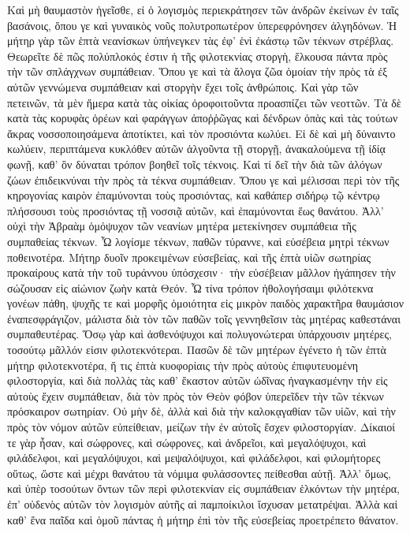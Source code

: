 Καὶ μὴ θαυμαστὸν ἡγεῖσθε, εἰ ὁ λογισμὸς περιεκράτησεν τῶν ἀνδρῶν ἐκείνων ἐν ταῖς βασάνοις, ὅπου γε καὶ γυναικὸς νοῦς πολυτροπωτέρον ὑπερεφρόνησεν ἀλγηδόνων. 
Ἡ μήτηρ γὰρ τῶν ἑπτὰ νεανίσκων ὑπήνεγκεν τὰς ἐφ' ἑνὶ ἐκάστῳ τῶν τέκνων στρέβλας. 
Θεωρεῖτε δὲ πῶς πολύπλοκός ἐστιν ἡ τῆς φιλοτεκνίας στοργὴ, ἕλκουσα πάντα πρὸς τὴν τῶν σπλάγχνων συμπάθειαν. 
Ὅπου γε καὶ τὰ ἄλογα ζῶα ὁμοίαν τὴν πρὸς τὰ ἐξ αὐτῶν γεννώμενα συμπάθειαν καὶ στοργὴν ἔχει τοῖς ἀνθρώποις. 
Καὶ γὰρ τῶν πετεινῶν, τὰ μὲν ἥμερα κατὰ τὰς οἰκίας ὀροφοιτοῦντα προασπίζει τῶν νεοττῶν. 
Τὰ δὲ κατὰ τὰς κορυφὰς ὀρέων καὶ φαράγγων ἀποῤῥῶγας καὶ δένδρων ὀπὰς καὶ τὰς τούτων ἄκρας νοσσοποιησάμενα ἀποτίκτει, καὶ τὸν προσιόντα κωλύει. 
Εἰ δὲ καὶ μὴ δύναιντο κωλύειν, περιπτάμενα κυκλόθεν αὐτῶν ἀλγοῦντα τῇ στοργῇ, ἀνακαλούμενα τῇ ἰδίᾳ φωνῇ, καθ' ὃν δύναται τρόπον βοηθεῖ τοῖς τέκνοις. 
Καὶ τί δεῖ τὴν διὰ τῶν ἀλόγων ζώων ἐπιδεικνύναι τὴν πρὸς τὰ τέκνα συμπάθειαν. 
Ὅπου γε καὶ μέλισσαι περὶ τὸν τῆς κηρογονίας καιρὸν ἐπαμύνονται τοὺς προσιόντας, καὶ καθάπερ σιδήρῳ τῷ κέντρῳ πλήσσουσι τοὺς προσιόντας τῇ νοσσιᾷ αὐτῶν, καὶ ἐπαμύνονται ἕως θανάτου. 
Ἀλλ' οὐχὶ τὴν Ἁβραὰμ ὁμόψυχον τῶν νεανίων μητέρα μετεκίνησεν συμπάθεια τῆς συμπαθείας τέκνων. 
Ὦ λογίσμε τέκνων, παθῶν τύραννε, καὶ εὐσέβεια μητρὶ τέκνων ποθεινοτέρα. 
Μήτηρ δυοῖν προκειμένων εὐσεβείας, καὶ τῆς ἑπτὰ υἱῶν σωτηρίας προκαίρους κατὰ τὴν τοῦ τυράννου ὑπόσχεσιν· 
τὴν εὐσέβειαν μᾶλλον ἠγάπησεν τὴν σώζουσαν εἰς αἰώνιον ζωὴν κατὰ Θεόν. 
Ὦ τίνα τρόπον ἠθολογήσαιμι φιλότεκνα γονέων πάθη, ψυχῆς τε καὶ μορφῆς ὁμοιότητα εἰς μικρὸν παιδὸς χαρακτῆρα θαυμάσιον ἐναπεσφράγιζον, μάλιστα διὰ τὸν τῶν παθῶν τοῖς γεννηθεῖσιν τὰς μητέρας καθεστάναι συμπαθευτέρας. 
Ὅσῳ γὰρ καὶ ἀσθενόψυχοι καὶ πολυγονώτεραι ὑπάρχουσιν μητέρες, τοσούτῳ μᾶλλόν εἰσιν φιλοτεκνότεραι. 
Πασῶν δὲ τῶν μητέρων ἐγένετο ἡ τῶν ἑπτὰ μήτηρ φιλοτεκνοτέρα, ἥ τις ἑπτὰ κυοφορίαις τὴν πρὸς αὐτοὺς ἐπιφυτευομένη φιλοστοργία, 
καὶ διὰ πολλὰς τὰς καθ' ἔκαστον αὐτῶν ὠδῖνας ἠναγκασμένην τὴν εἰς αὐτοὺς ἔχειν συμπάθειαν, 
διὰ τὸν πρὸς τὸν Θεὸν φόβον ὑπερεῖδεν τὴν τῶν τέκνων πρόσκαιρον σωτηρίαν. 
Οὐ μὴν δὲ, ἀλλὰ καὶ διὰ τὴν καλοκᾳγαθίαν τῶν υἱῶν, καὶ τὴν πρὸς τὸν νόμον αὐτῶν εὐπείθειαν, μείζων τὴν ἐν αὐτοῖς ἔσχεν φιλοστοργίαν. 
Δίκαιοί τε γὰρ ἦσαν, καὶ σώφρονες, καὶ σώφρονες, καὶ ἀνδρεῖοι, καὶ μεγαλόψυχοι, καὶ φιλάδελφοι, καὶ μεγαλόψυχοι, καὶ μεψαλόψυχοι, καὶ φιλάδελφοι, καὶ φιλομήτορες οὕτως, ὥστε καὶ μέχρι θανάτου τὰ νόμιμα φυλάσσοντες πείθεσθαι αὐτῇ. 
Ἀλλ' ὅμως, καὶ ὑπὲρ τοσούτων ὄντων τῶν περὶ φιλοτεκνίαν εἰς συμπάθειαν ἑλκόντων τὴν μητέρα, ἐπ' οὐδενὸς αὐτῶν τὸν λογισμὸν αὐτῆς αἱ παμποίκιλοι ἴσχυσαν μετατρέψαι. 
Ἀλλὰ καἰ καθ' ἔνα παῖδα καὶ ὁμοῦ πάντας ἡ μήτηρ ἐπὶ τὸν τῆς εὐσεβείας προετρέπετο θάνατον. 
